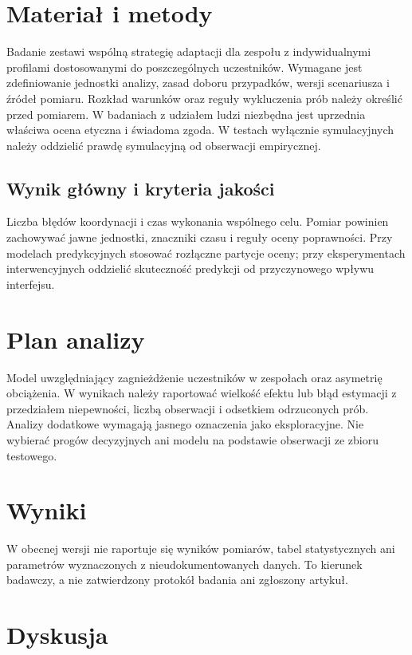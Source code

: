 \documentclass[11pt,a4paper]{article}
\begin{document}
\section{Materiał i metody}

Badanie zestawi wspólną strategię adaptacji dla zespołu z indywidualnymi profilami dostosowanymi do poszczególnych uczestników. Wymagane jest zdefiniowanie jednostki analizy, zasad doboru przypadków, wersji scenariusza i źródeł pomiaru. Rozkład warunków oraz reguły wykluczenia prób należy określić przed pomiarem. W badaniach z udziałem ludzi niezbędna jest uprzednia właściwa ocena etyczna i świadoma zgoda. W testach wyłącznie symulacyjnych należy oddzielić prawdę symulacyjną od obserwacji empirycznej.

\subsection{Wynik główny i kryteria jakości}

Liczba błędów koordynacji i czas wykonania wspólnego celu. Pomiar powinien zachowywać jawne jednostki, znaczniki czasu i reguły oceny poprawności. Przy modelach predykcyjnych stosować rozłączne partycje oceny; przy eksperymentach interwencyjnych oddzielić skuteczność predykcji od przyczynowego wpływu interfejsu.

\section{Plan analizy}

Model uwzględniający zagnieżdżenie uczestników w zespołach oraz asymetrię obciążenia. W wynikach należy raportować wielkość efektu lub błąd estymacji z przedziałem niepewności, liczbą obserwacji i odsetkiem odrzuconych prób. Analizy dodatkowe wymagają jasnego oznaczenia jako eksploracyjne. Nie wybierać progów decyzyjnych ani modelu na podstawie obserwacji ze zbioru testowego.

\section{Wyniki}

W obecnej wersji nie raportuje się wyników pomiarów, tabel statystycznych ani parametrów wyznaczonych z nieudokumentowanych danych. To kierunek badawczy, a nie zatwierdzony protokół badania ani zgłoszony artykuł.

\section{Dyskusja}
\end{document}
